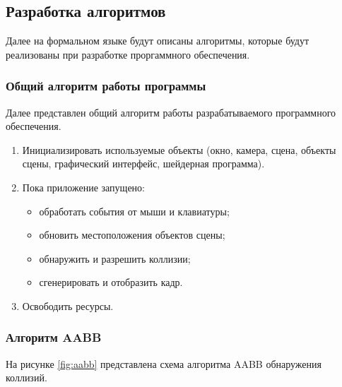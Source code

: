 \subsection{Разработка алгоритмов}

Далее на формальном языке будут описаны алгоритмы, которые будут реализованы при разработке проргаммного обеспечения.

\subsubsection{Общий алгоритм работы программы}

Далее представлен общий алгоритм работы разрабатываемого программного обеспечения.

\begin{enumerate}
    \item Инициализировать используемые объекты (окно, камера, сцена, объекты сцены, графический интерфейс, шейдерная программа).
    \item Пока приложение запущено:
        \begin{itemize}
            \item обработать события от мыши и клавиатуры;
            \item обновить местоположения объектов сцены;
            \item обнаружить и разрешить коллизии;
            \item сгенерировать и отобразить кадр.
        \end{itemize}
    \item Освободить ресурсы.
\end{enumerate}


\subsubsection{Алгоритм AABB}

На рисунке \ref{fig:aabb} представлена схема алгоритма AABB обнаружения коллизий.

